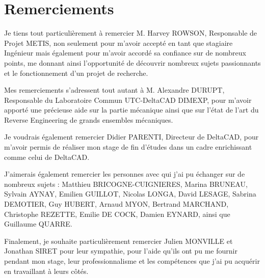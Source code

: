 \chapter*{Remerciements}


Je tiens tout particulièrement à remercier M. Harvey ROWSON, Responsable de Projet METIS, non seulement pour m’avoir accepté en tant que stagiaire Ingénieur mais également pour m’avoir accordé sa confiance sur de nombreux points, me donnant ainsi l’opportunité de découvrir nombreux sujets passionnants et le fonctionnement d'un projet de recherche. 

Mes remerciements s’adressent tout autant à M. Alexandre DURUPT, Responsable du Laboratoire Commun UTC-DeltaCAD DIMEXP, pour m'avoir apporté une précieuse aide sur la partie mécanique ainsi que sur l'état de l'art du Reverse Engineering de grands ensembles mécaniques.

Je voudrais également remercier Didier PARENTI, Directeur de DeltaCAD, pour m'avoir permis de réaliser mon stage de fin d'études dans un cadre enrichissant comme celui de DeltaCAD.

J’aimerais également remercier les personnes avec qui j'ai pu échanger sur de nombreux sujets : Matthieu BRICOGNE-CUIGNIERES, Marina BRUNEAU, Sylvain AYNAY, Emilien GUILLOT, Nicolas LONGA, David LESAGE, Sabrina DEMOTIER, Guy HUBERT, Arnaud MYON, Bertrand MARCHAND, Christophe REZETTE, Emilie DE COCK, Damien EYNARD, ainsi que Guillaume QUARRE. 

Finalement, je souhaite particulièrement remercier Julien MONVILLE et Jonathan SIRET pour leur sympathie, pour l’aide qu’ils ont pu me fournir pendant mon stage, leur professionnalisme et les compétences que j’ai pu acquérir en travaillant à leurs côtés.

